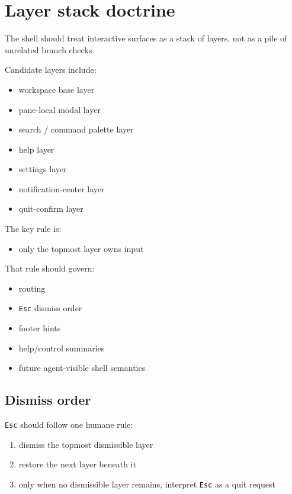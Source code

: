 \section{Layer stack doctrine}\label{record-047-layer-stack-doctrine}

The shell should treat interactive surfaces as a stack of layers, not as a pile of unrelated branch checks.

Candidate layers include:

\begin{itemize}
\tightlist
\item
  workspace base layer
\item
  pane-local modal layer
\item
  search / command palette layer
\item
  help layer
\item
  settings layer
\item
  notification-center layer
\item
  quit-confirm layer
\end{itemize}

The key rule is:

\begin{itemize}
\tightlist
\item
  only the topmost layer owns input
\end{itemize}

That rule should govern:

\begin{itemize}
\tightlist
\item
  routing
\item
  \texttt{E\allowbreak{}s\allowbreak{}c} dismiss order
\item
  footer hints
\item
  help/control summaries
\item
  future agent-visible shell semantics
\end{itemize}

\subsection{Dismiss order}\label{record-047-dismiss-order}

\texttt{E\allowbreak{}s\allowbreak{}c} should follow one humane rule:

\begin{enumerate}
\def\labelenumi{\arabic{enumi}.}
\tightlist
\item
  dismiss the topmost dismissible layer
\item
  restore the next layer beneath it
\item
  only when no dismissible layer remains, interpret \texttt{E\allowbreak{}s\allowbreak{}c} as a quit request
\end{enumerate}

